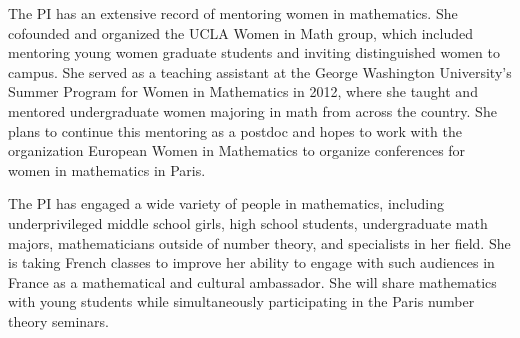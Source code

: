 \documentclass[11pt]{amsart}
\theoremstyle{definition}
\theoremstyle{remark}
\begin{document}
The PI has an extensive record of mentoring women in mathematics.  She cofounded and organized the UCLA Women in Math group, which included mentoring young women graduate students and inviting distinguished women to campus.  She served as a teaching assistant at the George Washington University's Summer Program for Women in Mathematics in 2012, where she taught and mentored undergraduate women majoring in math from across the country.  She plans to continue this mentoring as a postdoc and hopes to work with the organization European Women in Mathematics to organize conferences for women in mathematics in Paris.

The PI has engaged a wide variety of people in mathematics, including underprivileged middle school girls, high school students, undergraduate math majors, mathematicians outside of number theory, and specialists in her field.  She is taking French classes to improve her ability to engage with such audiences in France as a mathematical and cultural ambassador.  She will share mathematics with young students while simultaneously participating in the Paris number theory seminars.  

\newpage

\normalsize{}{}

\end{document}
